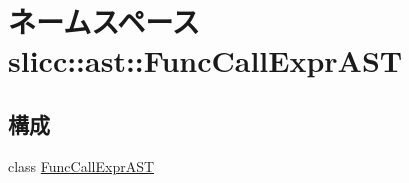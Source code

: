 \hypertarget{namespaceslicc_1_1ast_1_1FuncCallExprAST}{
\section{ネームスペース slicc::ast::FuncCallExprAST}
\label{namespaceslicc_1_1ast_1_1FuncCallExprAST}
}
\subsection*{構成}
\begin{DoxyCompactItemize}
\item 
class \hyperlink{classslicc_1_1ast_1_1FuncCallExprAST_1_1FuncCallExprAST}{FuncCallExprAST}
\end{DoxyCompactItemize}
